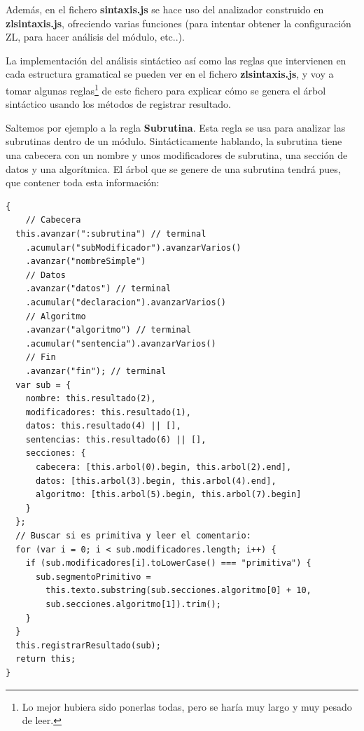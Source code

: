 \documentclass{report}
\begin{document}
	\vspace{10px}
	
	Además, en el fichero \textbf{sintaxis.js} se hace uso del analizador construido en \textbf{zlsintaxis.js}, ofreciendo varias funciones (para intentar obtener la configuración ZL, para hacer análisis del módulo, etc..).
	
	\vspace{10px}
	
	La implementación del análisis sintáctico así como las reglas que intervienen en cada estructura gramatical se pueden ver en el fichero \textbf{zlsintaxis.js}, y voy a tomar algunas reglas\footnote{Lo mejor hubiera sido ponerlas todas, pero se haría muy largo y muy pesado de leer.} de este fichero para explicar cómo se genera el árbol sintáctico usando los métodos de registrar resultado.
	
	\vspace{10px}
	
	Saltemos por ejemplo a la regla \textbf{Subrutina}. Esta regla se usa para analizar las subrutinas dentro de un módulo. Sintácticamente hablando, la subrutina tiene una cabecera con un nombre y unos modificadores de subrutina, una sección de datos y una algorítmica. El árbol que se genere de una subrutina tendrá pues, que contener toda esta información:
	
\begin{BVerbatim}
{
    // Cabecera
  this.avanzar(":subrutina") // terminal
    .acumular("subModificador").avanzarVarios()
    .avanzar("nombreSimple")
    // Datos
    .avanzar("datos") // terminal
    .acumular("declaracion").avanzarVarios()
    // Algoritmo
    .avanzar("algoritmo") // terminal
    .acumular("sentencia").avanzarVarios()
    // Fin
    .avanzar("fin"); // terminal
  var sub = {
    nombre: this.resultado(2),
    modificadores: this.resultado(1),
    datos: this.resultado(4) || [],
    sentencias: this.resultado(6) || [],
    secciones: {
      cabecera: [this.arbol(0).begin, this.arbol(2).end],
      datos: [this.arbol(3).begin, this.arbol(4).end],
      algoritmo: [this.arbol(5).begin, this.arbol(7).begin]
    }
  };
  // Buscar si es primitiva y leer el comentario:
  for (var i = 0; i < sub.modificadores.length; i++) {
    if (sub.modificadores[i].toLowerCase() === "primitiva") {
      sub.segmentoPrimitivo = 
        this.texto.substring(sub.secciones.algoritmo[0] + 10, 
        sub.secciones.algoritmo[1]).trim();
    }
  }
  this.registrarResultado(sub);
  return this;
}
\end{BVerbatim}
\end{document}
